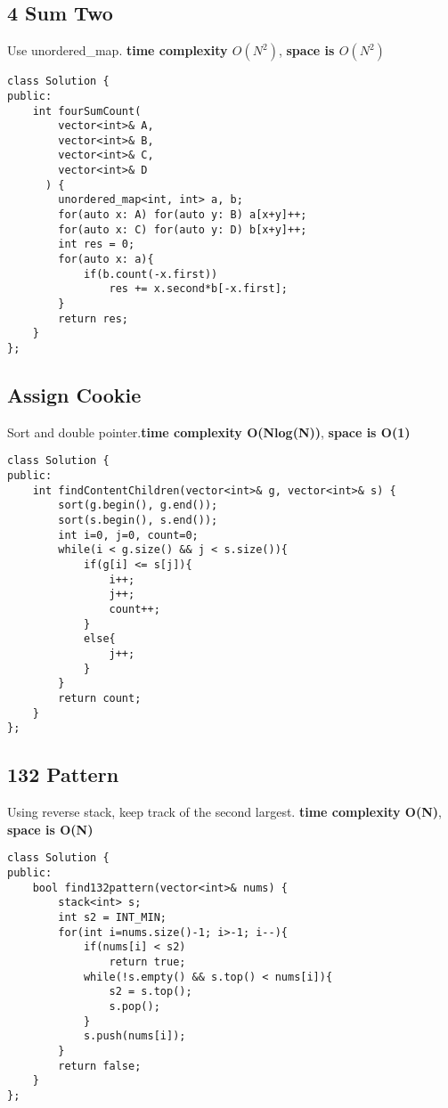\subsection{4 Sum Two}
Use unordered\_map. {\color{blue}\textbf{time complexity $O(N^2)$}}, {\color{blue}\textbf{space is $O(N^2)$}}

\begin{lstlisting}
class Solution {
public:
    int fourSumCount(
        vector<int>& A,
        vector<int>& B,
        vector<int>& C,
        vector<int>& D
      ) {
        unordered_map<int, int> a, b;
        for(auto x: A) for(auto y: B) a[x+y]++;
        for(auto x: C) for(auto y: D) b[x+y]++;
        int res = 0;
        for(auto x: a){
            if(b.count(-x.first))
                res += x.second*b[-x.first];
        }
        return res;
    }
};
\end{lstlisting}


\subsection{Assign Cookie}
Sort and double pointer.{\color{blue}\textbf{time complexity O(Nlog(N))}}, {\color{blue}\textbf{space is O(1)}}
\begin{lstlisting}
class Solution {
public:
    int findContentChildren(vector<int>& g, vector<int>& s) {
        sort(g.begin(), g.end());
        sort(s.begin(), s.end());
        int i=0, j=0, count=0;
        while(i < g.size() && j < s.size()){
            if(g[i] <= s[j]){
                i++;
                j++;
                count++;
            }
            else{
                j++;
            }
        }
        return count;
    }
};
\end{lstlisting}


\subsection{132 Pattern}
Using reverse stack, keep track of the second largest. {\color{blue}\textbf{time complexity O(N)}}, {\color{blue}\textbf{space is O(N)}}
\begin{lstlisting}
class Solution {
public:
    bool find132pattern(vector<int>& nums) {
        stack<int> s;
        int s2 = INT_MIN;
        for(int i=nums.size()-1; i>-1; i--){
            if(nums[i] < s2)
                return true;
            while(!s.empty() && s.top() < nums[i]){
                s2 = s.top();
                s.pop();
            }
            s.push(nums[i]);
        }
        return false;
    }
};
\end{lstlisting}

\subsection{}
